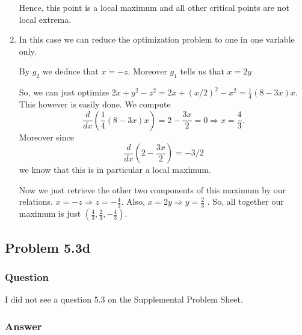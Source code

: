 \documentclass[12pt]{article}
\begin{document}
\begin{enumerate}
Hence, this point is a local maximum and  all other critical points are not local extrema. 

\item In this case we can reduce the optimization problem to one in one variable only.

By $g_2$ we deduce that $x=-z$. Moreover $g_1$ tells us that $x=2y$

So, we can just optimize $2x+y^2-z^2 = 2x +(x/2)^2-x^2 = \frac{1}{4} (8-3 x) x$. This however is easily done. We compute
\[\frac{d}{dx} (\frac{1}{4} (8-3 x) x) = 2-\frac{3 x}{2} = 0 \Rightarrow x=\frac{4}{3}.\] Moreover since 
\[\frac{d}{dx}\left(  2-\frac{3 x}{2} \right) = -3/2 \]
we know that this is in particular a local maximum.

Now we just retrieve the other two components of this maximum by our relations. $x=-z \Rightarrow z = - \frac{4}{3}.$ Also, $x=2y \Rightarrow y= \frac{2}{3}$ . So, all together our maximum is just $(\frac{4}{3},\frac{2}{3}, -\frac{4}{3} )$.

\end{enumerate}


\subsection{Problem 5.3d}
\subsubsection{Question}
I did not see a question 5.3 on the Supplemental Problem Sheet.
\subsubsection{Answer}
\end{document}
